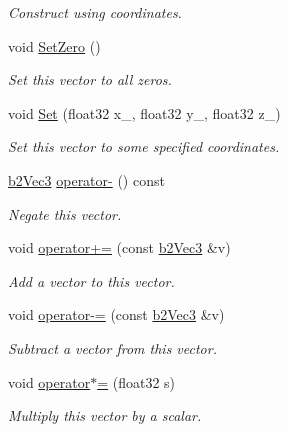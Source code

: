 \begin{DoxyCompactItemize}
\begin{DoxyCompactList}\small\item\em Construct using coordinates. \end{DoxyCompactList}\item 
\mbox{\label{structb2Vec3_a5a459ed49f1910a347ca247f848a2dd8}} 
void \hyperlink{structb2Vec3_a5a459ed49f1910a347ca247f848a2dd8}{Set\+Zero} ()
\begin{DoxyCompactList}\small\item\em Set this vector to all zeros. \end{DoxyCompactList}\item 
\mbox{\label{structb2Vec3_a12a1bc14bbe722dfb175a492d2d00a79}} 
void \hyperlink{structb2Vec3_a12a1bc14bbe722dfb175a492d2d00a79}{Set} (float32 x\+\_\+, float32 y\+\_\+, float32 z\+\_\+)
\begin{DoxyCompactList}\small\item\em Set this vector to some specified coordinates. \end{DoxyCompactList}\item 
\mbox{\label{structb2Vec3_a396e2b5b3c53a502859ff80544c27db8}} 
\hyperlink{structb2Vec3}{b2\+Vec3} \hyperlink{structb2Vec3_a396e2b5b3c53a502859ff80544c27db8}{operator-\/} () const
\begin{DoxyCompactList}\small\item\em Negate this vector. \end{DoxyCompactList}\item 
\mbox{\label{structb2Vec3_a2aaeed3f5308aad85d19c5f0efc72641}} 
void \hyperlink{structb2Vec3_a2aaeed3f5308aad85d19c5f0efc72641}{operator+=} (const \hyperlink{structb2Vec3}{b2\+Vec3} \&v)
\begin{DoxyCompactList}\small\item\em Add a vector to this vector. \end{DoxyCompactList}\item 
\mbox{\label{structb2Vec3_a9e5b535548e1c5dfc0dc258d08f5ca32}} 
void \hyperlink{structb2Vec3_a9e5b535548e1c5dfc0dc258d08f5ca32}{operator-\/=} (const \hyperlink{structb2Vec3}{b2\+Vec3} \&v)
\begin{DoxyCompactList}\small\item\em Subtract a vector from this vector. \end{DoxyCompactList}\item 
\mbox{\label{structb2Vec3_aaa9aa20195cd0ee53c7176a9a9b02389}} 
void \hyperlink{structb2Vec3_aaa9aa20195cd0ee53c7176a9a9b02389}{operator$\ast$=} (float32 s)
\begin{DoxyCompactList}\small\item\em Multiply this vector by a scalar. \end{DoxyCompactList}\end{DoxyCompactItemize}
